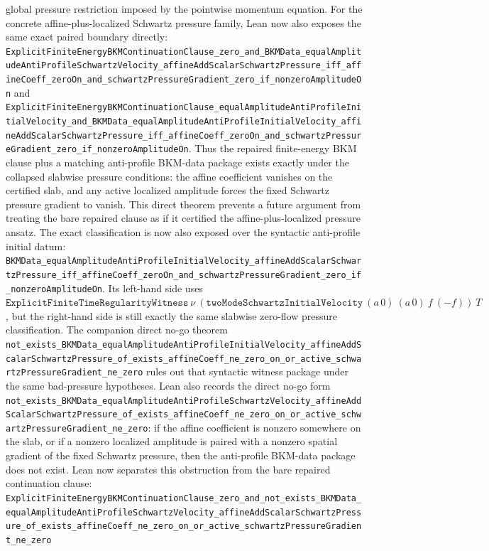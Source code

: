 \documentclass[11pt]{article}
\begin{document}
global pressure restriction imposed by the pointwise momentum equation.
For the concrete affine-plus-localized Schwartz pressure family, Lean now
also exposes the same exact paired boundary directly:
\texttt{ExplicitFiniteEnergyBKMContinuationClause\_zero\_and\_BKMData\_equalAmplitudeAntiProfileSchwartzVelocity\_affineAddScalarSchwartzPressure\_iff\_affineCoeff\_zeroOn\_and\_schwartzPressureGradient\_zero\_if\_nonzeroAmplitudeOn}
and
\texttt{ExplicitFiniteEnergyBKMContinuationClause\_equalAmplitudeAntiProfileInitialVelocity\_and\_BKMData\_equalAmplitudeAntiProfileInitialVelocity\_affineAddScalarSchwartzPressure\_iff\_affineCoeff\_zeroOn\_and\_schwartzPressureGradient\_zero\_if\_nonzeroAmplitudeOn}.
Thus the repaired finite-energy BKM clause plus a matching anti-profile
BKM-data package exists exactly under the collapsed slabwise pressure
conditions: the affine coefficient vanishes on the certified slab, and any
active localized amplitude forces the fixed Schwartz pressure gradient to
vanish.  This direct theorem prevents a future argument from treating the
bare repaired clause as if it certified the affine-plus-localized pressure
ansatz.
The exact classification is now also exposed over the syntactic anti-profile
initial datum:
\texttt{BKMData\_equalAmplitudeAntiProfileInitialVelocity\_affineAddScalarSchwartzPressure\_iff\_affineCoeff\_zeroOn\_and\_schwartzPressureGradient\_zero\_if\_nonzeroAmplitudeOn}.
Its left-hand side uses
\(\texttt{ExplicitFiniteTimeRegularityWitness}\ \nu\
(\texttt{twoModeSchwartzInitialVelocity}\ (a\,0)\ (a\,0)\ f\ (-f))\ T\), but
the right-hand side is still exactly the same slabwise zero-flow pressure
classification.  The companion direct no-go theorem
\texttt{not\_exists\_BKMData\_equalAmplitudeAntiProfileInitialVelocity\_affineAddScalarSchwartzPressure\_of\_exists\_affineCoeff\_ne\_zero\_on\_or\_active\_schwartzPressureGradient\_ne\_zero}
rules out that syntactic witness package under the same bad-pressure
hypotheses.
Lean also records the direct no-go form
\texttt{not\_exists\_BKMData\_equalAmplitudeAntiProfileSchwartzVelocity\_affineAddScalarSchwartzPressure\_of\_exists\_affineCoeff\_ne\_zero\_on\_or\_active\_schwartzPressureGradient\_ne\_zero}:
if the affine coefficient is nonzero somewhere on the slab, or if a nonzero
localized amplitude is paired with a nonzero spatial gradient of the fixed
Schwartz pressure, then the anti-profile BKM-data package does not exist.
Lean now separates this obstruction from the bare repaired continuation clause:
\texttt{ExplicitFiniteEnergyBKMContinuationClause\_zero\_and\_not\_exists\_BKMData\_equalAmplitudeAntiProfileSchwartzVelocity\_affineAddScalarSchwartzPressure\_of\_exists\_affineCoeff\_ne\_zero\_on\_or\_active\_schwartzPressureGradient\_ne\_zero}
\end{document}
